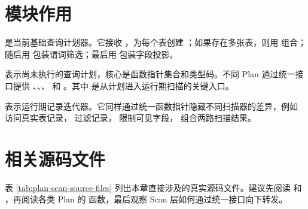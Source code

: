 \section{模块作用}
\label{sec:plan-scan-role}

 是当前基础查询计划器。它接收 ，为每个表创建 ；如果存在多张表，则用  组合；随后用  包装谓词筛选；最后用  包装字段投影。

 表示尚未执行的查询计划，核心是函数指针集合和类型码。不同 Plan 通过统一接口提供 、、、 和 。其中  是从计划进入运行期扫描的关键入口。

 表示运行期记录迭代器。它同样通过统一函数指针隐藏不同扫描器的差异，例如  访问真实表记录， 过滤记录， 限制可见字段， 组合两路扫描结果。

\section{相关源码文件}
\label{sec:plan-scan-source-files}

表 \ref{tab:plan-scan-source-files} 列出本章直接涉及的真实源码文件。建议先阅读  和 ，再阅读各类 Plan 的  函数，最后观察 Scan 层如何通过统一接口向下转发。

